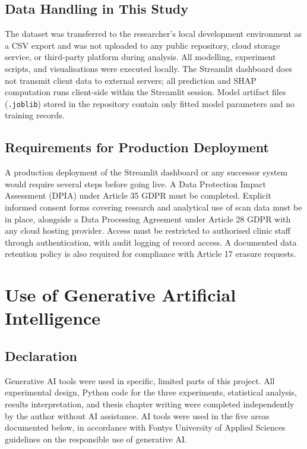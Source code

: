 \documentclass[11pt,a4paper]{report}
\begin{document}
\begin{appendices}
\section{Data Handling in This Study}

The dataset was transferred to the researcher's local development environment as a CSV export and
was not uploaded to any public repository, cloud storage service, or third-party platform during
analysis. All modelling, experiment scripts, and visualisations were executed locally. The Streamlit
dashboard does not transmit client data to external servers; all prediction and SHAP computation
runs client-side within the Streamlit session. Model artifact files (\texttt{.joblib}) stored in
the repository contain only fitted model parameters and no training records.

\section{Requirements for Production Deployment}

A production deployment of the Streamlit dashboard or any successor system would require several
steps before going live. A Data Protection Impact Assessment (DPIA) under Article 35 GDPR must
be completed. Explicit informed consent forms covering research and analytical use of scan data
must be in place, alongside a Data Processing Agreement under Article 28 GDPR with any cloud
hosting provider. Access must be restricted to authorised clinic staff through authentication,
with audit logging of record access. A documented data retention policy is also required for
compliance with Article 17 erasure requests.

\chapter{Use of Generative Artificial Intelligence}

\section{Declaration}

Generative AI tools were used in specific, limited parts of this project. All experimental design, Python code for the three experiments, statistical analysis, results interpretation, and thesis chapter writing were completed independently by the author without AI assistance. AI tools were used in the five areas documented below, in accordance with Fontys University of Applied Sciences guidelines on the responsible use of generative AI.


\end{appendices}
\end{document}
